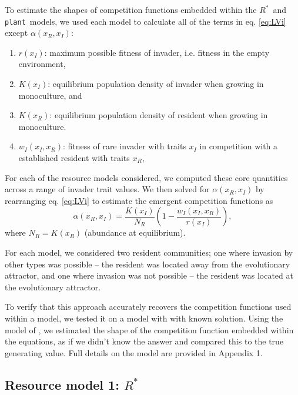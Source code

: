 \documentclass[a4paper,11pt]{article}
\newcommand{\Rstar}{\ensuremath{R^*}}
\newcommand{\plant}{{\tt plant}}
\begin{document}
To estimate the shapes of competition functions embedded within the \Rstar\ and \plant\ models, we used each model to calculate all of the terms in eq. \ref{eq:LVi} except $\alpha(x_R, x_I)$:
\begin{enumerate}
\item $r(x_I)$: maximum possible fitness of invader, i.e. fitness in the empty environment,
\item $K(x_I)$: equilibrium population density of invader when growing in monoculture, and
\item $K(x_R)$: equilibrium population density of resident when growing in monoculture.
\item $w_I(x_I, x_R)$: fitness of rare invader with traits $x_I$ in competition with a established resident with traits $x_R$,
\end{enumerate}

For each of the resource models considered, we computed these core quantities across a range of invader trait values. We then solved for $\alpha(x_R, x_I)$ by rearranging eq. \ref{eq:LVi} to estimate the emergent competition functions as
\begin{equation} \label{eq:alpha}
  \alpha(x_R, x_I) = \frac{K(x_I)}{N_R} \left(1 - \frac{w_I(x_I, x_R)}{r(x_I)}\right),
\end{equation}
where $N_R = K(x_R)$ (abundance at equilibrium). 


For each model, we considered two resident communities; one where invasion by other types was possible -- the resident was located away from the evolutionary attractor, and one where invasion was not possible -- the resident was located at the evolutionary attractor.

To verify that this approach accurately recovers the competition functions used within a model, we tested it on a model with with known solution. Using the model of \citet{Dieckmann-1999}, we estimated the shape of the competition function embedded within the equations, as if we didn't know the answer and compared this to the true generating value. Full details on the model are provided in Appendix 1.


\subsection{Resource model 1: \Rstar }
\end{document}
